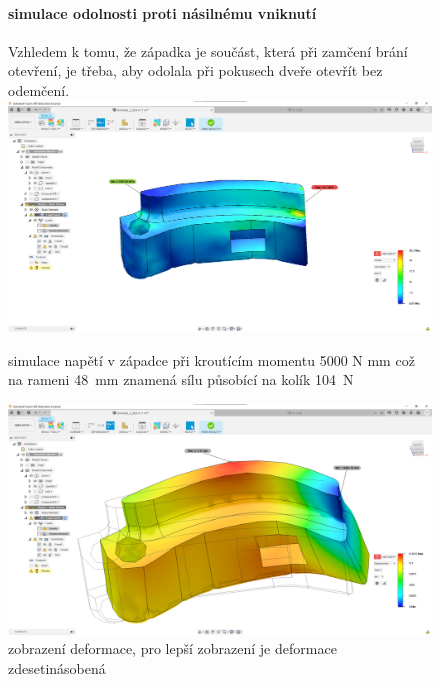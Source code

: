 \begin{figure}[htbp]
    \paragraph{simulace odolnosti proti násilnému vniknutí}
    Vzhledem k tomu, že západka je součást, která při zamčení brání otevření, je třeba, aby odolala při pokusech dveře otevřít bez odemčení.
    \centering
    \includegraphics[width=\textwidth]{kapitoly/obrazky/E4/zapadka/simulace/napeti_D1-M5000.png}
    \caption{simulace napětí v západce při kroutícím momentu 5000 N \cdot mm což na rameni 48~mm znamená sílu působící na kolík 104~N}
    \includegraphics[width=\textwidth]{kapitoly/obrazky/E4/zapadka/simulace/Dislokace_D10-M5000.png}
    \caption{zobrazení deformace, pro lepší zobrazení je deformace zdesetinásobená}
    \label{fig:E4-simulace_zapadky}
\end{figure}


\newpage